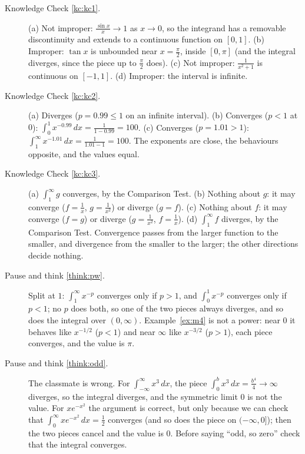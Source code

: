 \documentclass[11pt]{article}
\begin{document}
\begin{description}
  \item[Knowledge Check \ref{kc:kc1}.] (a) Not improper: $\frac{\sin x}x\to1$ as $x\to0$, so the integrand has a removable discontinuity and extends to a continuous function on $[0,1]$. (b) Improper: $\tan x$ is unbounded near $x=\frac\pi2$, inside $[0,\pi]$ (and the integral diverges, since the piece up to $\frac\pi2$ does). (c) Not improper: $\frac1{x^2+1}$ is continuous on $[-1,1]$. (d) Improper: the interval is infinite.
  \item[Knowledge Check \ref{kc:kc2}.] (a) Diverges ($p=0.99\le1$ on an infinite interval). (b) Converges ($p<1$ at $0$): $\int_0^1x^{-0.99}\,dx=\frac1{1-0.99}=100$. (c) Converges ($p=1.01>1$): $\int_1^\infty x^{-1.01}\,dx=\frac1{1.01-1}=100$. The exponents are close, the behaviours opposite, and the values equal.
  \item[Knowledge Check \ref{kc:kc3}.] (a) $\int_1^\infty g$ converges, by the Comparison Test. (b) Nothing about $g$: it may converge ($f=\frac1x$, $g=\frac1{x^2}$) or diverge ($g=f$). (c) Nothing about $f$: it may converge ($f=g$) or diverge ($g=\frac1{x^2}$, $f=\frac1x$). (d) $\int_1^\infty f$ diverges, by the Comparison Test. Convergence passes from the larger function to the smaller, and divergence from the smaller to the larger; the other directions decide nothing.
  \item[Pause and think \ref{think:pw}.] Split at $1$: $\int_1^\infty x^{-p}$ converges only if $p>1$, and $\int_0^1x^{-p}$ converges only if $p<1$; no $p$ does both, so one of the two pieces always diverges, and so does the integral over $(0,\infty)$. Example~\ref{ex:m4} is not a power: near $0$ it behaves like $x^{-1/2}$ ($p<1$) and near $\infty$ like $x^{-3/2}$ ($p>1$), each piece converges, and the value is $\pi$.
  \item[Pause and think \ref{think:odd}.] The classmate is wrong. For $\int_{-\infty}^\infty x^3\,dx$, the piece $\int_0^b x^3\,dx=\frac{b^4}4\to\infty$ diverges, so the integral diverges, and the symmetric limit $0$ is not the value. For $xe^{-x^2}$ the argument is correct, but only because we can check that $\int_0^\infty xe^{-x^2}\,dx=\frac12$ converges (and so does the piece on $(-\infty,0]$); then the two pieces cancel and the value is $0$. Before saying ``odd, so zero'' check that the integral converges.

\end{description}
\end{document}
